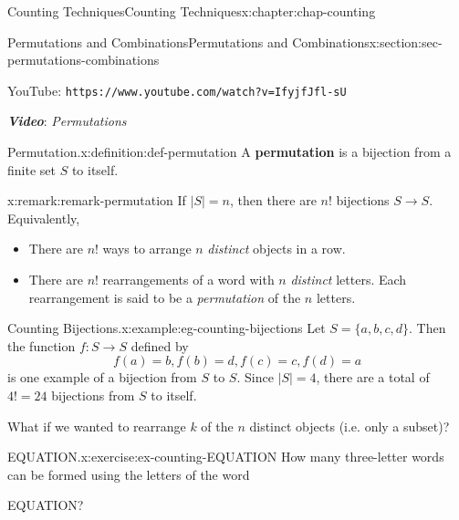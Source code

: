 \documentclass[oneside,10pt,]{book}
\newcommand{\mono}[1]{\texttt{#1}}
\newcommand{\alert}[1]{\textbf{\textit{#1}}}
\newcommand{\terminology}[1]{\textbf{#1}}
\numberwithin{equation}{section}
\newlength{\qrsize}
\newlength{\previewwidth}
\begin{document}
\begin{chapterptx}{Counting Techniques}{}{Counting Techniques}{}{}{x:chapter:chap-counting}
\begin{sectionptx}{Permutations and Combinations}{}{Permutations and Combinations}{}{}{x:section:sec-permutations-combinations}
\begin{sidebyside}{1}{0}{0}{0}
\begin{sbspanel}{1}
\begin{tcbraster}[raster columns=2, raster column skip=1pt, raster halign=center, raster force size=false, raster left skip=0pt, raster right skip=0pt]
\begin{tcolorbox}[previewstyle, width=\previewwidth]
\end{tcolorbox}%
\begin{tcolorbox}[qrstyle]%
{\hypersetup{urlcolor=black}}%
\end{tcolorbox}%
\begin{tcolorbox}[captionstyle]%
\small YouTube: \mono{https://www.youtube.com/watch?v=IfyjfJfl-sU}\end{tcolorbox}%
\end{tcbraster}%
\end{sbspanel}%
\end{sidebyside}%
\par
\alert{Video}: \emph{Permutations}%
\begin{definition}{Permutation.}{x:definition:def-permutation}%
A \terminology{permutation} is a bijection from a finite set \(S\) to itself.%
\end{definition}
\begin{remark}{}{x:remark:remark-permutation}%
If \(|S| = n\), then there are \(n!\) bijections \(S \rightarrow S\). Equivalently,%
\begin{itemize}[label=\textbullet]
\item{}There are \(n!\) ways to arrange \(n\) \emph{distinct} objects in a row.%
\item{}There are \(n!\) rearrangements of a word with \(n\) \emph{distinct} letters. Each rearrangement is said to be a \emph{permutation} of the \(n\) letters.%
\end{itemize}
%
\end{remark}
\begin{example}{Counting Bijections.}{x:example:eg-counting-bijections}%
Let \(S = \{a,b,c,d\}\). Then the function \(f: S \rightarrow S\) defined by%
\begin{equation*}
f(a) = b, f(b) = d, f(c) = c, f(d) = a
\end{equation*}
is one example of a bijection from \(S\) to \(S\). Since \(|S| = 4\), there are a total of \(4! = 24\) bijections from \(S\) to itself.%
\end{example}
What if we wanted to rearrange \(k\) of the \(n\) distinct objects (i.e. only a subset)?%
\begin{inlineexercise}{EQUATION.}{x:exercise:ex-counting-EQUATION}%
How many three-letter words can be formed using the letters of the word%
\begin{sidebyside}{1}{0.4}{0.4}{0}%
\begin{sbspanel}{0.2}%
EQUATION?%

\end{sbspanel}
\end{sidebyside}
\end{inlineexercise}
\end{sectionptx}
\end{chapterptx}
\end{document}
